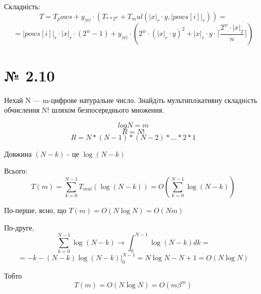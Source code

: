\documentclass[11pt, a4paper]{article} %
\begin{document}
Складність:
$$T = T_pows + y_|w| \cdot \left(T_{**2^w} + T_mul(|x|_r \cdot y, |pows[i]|_r)\right) = $$
$$= |pows[i]|_r \cdot |x|_r \cdot (2^w-1) + y_|w| \cdot (2^w \cdot (|x|_r \cdot y)^2 +  |x|_r \cdot y \cdot \lceil\frac{2^w \cdot |x|_2}{n}\rceil) $$



\section*{№  2.10}
\begin{mdframed}
    Нехай N — m-цифрове натуральне число. 
    Знайдiть мультиплiкативну складнiсть обчислення N! шляхом безпосереднього множення.
\end{mdframed}

$$log N = m$$
$$R = N!$$
$$R = N*(N-1)*(N-2)* ... * 2 * 1$$

Довжина $(N-k)$ - це $\log (N-k)$

Всього: $$T(m) = \sum_{k=0}^{N-1} T_{mul}(\log (N-k)) = O\left(\sum_{k=0}^{N-1} \log (N-k)\right)$$

По-перше, ясно, що $T(m) = O(N \log N) = O(Nm)$

По-друге, 
$$\sum_{k=0}^{N-1} \log (N-k) \to \int_0^{N-1} \log (N-k) dk = $$
$$= - k - (N-k)\log (N-k) |_0^{N-1} 
= N\log N - N + 1 = O(N\log N)$$

Тобто
$$T(m) = O(N\log N) = O(m\beta^m)$$
\end{document}
